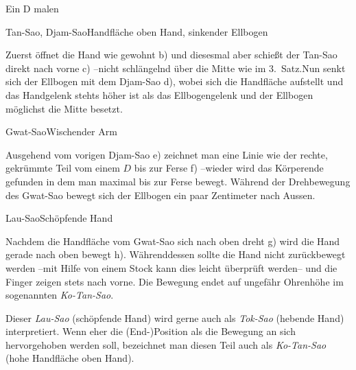 
\begin{WTSatz}{Ein D malen}%

	
	\begin{WTSatzTeil}{Tan-Sao, Djam-Sao}{Handfl\"ache oben Hand, sinkender Ellbogen}
		
		Zuerst \"offnet die Hand wie gewohnt b) und diesesmal aber schie{\ss}t der Tan-Sao direkt nach vorne c) --nicht schl\"angelnd \"uber die Mitte wie im 3.~Satz.Nun senkt sich der Ellbogen mit dem Djam-Sao d), wobei sich die Handfl\"ache aufstellt und das Handgelenk stehts h\"oher ist als das Ellbogengelenk und der Ellbogen m\"oglichst die Mitte besetzt.
		
	\end{WTSatzTeil}
	\begin{WTSatzTeil}{Gwat-Sao}{Wischender Arm}
		
		Ausgehend vom vorigen Djam-Sao e) zeichnet man eine Linie wie der rechte, gekr\"ummte Teil vom einem $D$ bis zur Ferse f) --wieder wird das K\"orperende gefunden in dem man maximal bis zur Ferse bewegt. W\"ahrend der Drehbewegung des Gwat-Sao bewegt sich der Ellbogen ein paar Zentimeter nach Aussen.
		
	\end{WTSatzTeil}
	\begin{WTSatzTeil}{Lau-Sao}{Sch\"opfende Hand}
		
		Nachdem die Handfl\"ache vom Gwat-Sao sich nach oben dreht g) wird die Hand gerade nach oben bewegt h). W\"ahrenddessen sollte die Hand nicht zur\"uckbewegt werden --mit Hilfe von einem Stock kann dies leicht \"uberpr\"uft werden-- und die Finger zeigen stets nach vorne. Die Bewegung endet auf ungef\"ahr Ohrenh\"ohe im sogenannten \textit{Ko-Tan-Sao}.
		
		
	\begin{WTCommonBegriff}
		Dieser \textit{Lau-Sao} (sch\"opfende Hand) wird gerne auch als \textit{Tok-Sao} (hebende Hand) interpretiert. Wenn eher die (End-)Position als die Bewegung an sich hervorgehoben werden soll, bezeichnet man diesen Teil auch als \textit{Ko-Tan-Sao} (hohe Handfl\"ache oben Hand).
	\end{WTCommonBegriff}
	

\end{WTSatzTeil}
\end{WTSatz}
